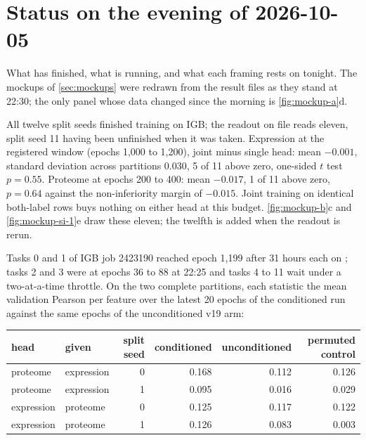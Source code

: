 
\clearpage
\section{Status on the evening of 2026-10-05}
\label{sec:status}

What has finished, what is running, and what each framing rests on tonight. The mockups of
\cref{sec:mockups} were redrawn from the result files as they stand at 22:30; the only panel
whose data changed since the morning is \cref{fig:mockup-a}d.

 All twelve split seeds
finished training on IGB; the readout on file reads eleven, split seed 11 having been
unfinished when it was taken. Expression at the registered window (epochs 1{,}000 to
1{,}200), joint minus single head: mean $-0.001$, standard deviation across partitions
$0.030$, 5 of 11 above zero, one-sided $t$ test $p = 0.55$. Proteome at epochs 200 to 400:
mean $-0.017$, 1 of 11 above zero, $p = 0.64$ against the non-inferiority margin of
$-0.015$. Joint training on identical both-label rows buys nothing on either head at this
budget. \cref{fig:mockup-b}c and \cref{fig:mockup-si-1}e draw these eleven; the twelfth is
added when the readout is rerun.

 Tasks 0 and 1 of IGB job 2423190
reached epoch 1{,}199 after 31 hours each on ; tasks 2 and 3 were at epochs 36
to 88 at 22:25 and tasks 4 to 11 wait under a two-at-a-time throttle. On the two complete
partitions, each statistic the mean validation Pearson per feature over the latest 20
epochs of the conditioned run against the same epochs of the unconditioned v19 arm:

\begin{center}\footnotesize
\begin{tabular}{@{}llrrrr@{}}
\toprule
head & given & split seed & conditioned & unconditioned & permuted control \\
\midrule
proteome   & expression & 0 & 0.168 & 0.112 & 0.126 \\
proteome   & expression & 1 & 0.095 & 0.016 & 0.029 \\
expression & proteome   & 0 & 0.125 & 0.117 & 0.122 \\
expression & proteome   & 1 & 0.126 & 0.083 & 0.003 \\
\bottomrule
\end{tabular}
\end{center}

